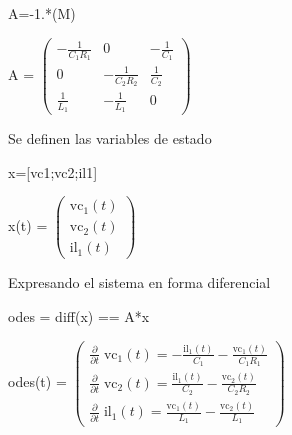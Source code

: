 \documentclass[10pt,a4paper]{article} %
\begin{document}
	\begin{matlabcode}
		A=-1.*(M\N)
	\end{matlabcode}
	\begin{matlabsymbolicoutput}
		A = 
		$\displaystyle \left(\begin{array}{ccc}
		-\frac{1}{C_1  R_1 } & 0 & -\frac{1}{C_1 }\\
		0 & -\frac{1}{C_2  R_2 } & \frac{1}{C_2 }\\
		\frac{1}{L_1 } & -\frac{1}{L_1 } & 0
		\end{array}\right)$
	\end{matlabsymbolicoutput}
	
	\begin{par}
		\begin{flushleft}
			Se definen las variables de estado
		\end{flushleft}
	\end{par}
	
	\begin{matlabcode}
		x=[vc1;vc2;il1]
	\end{matlabcode}
	\begin{matlabsymbolicoutput}
		x(t) = 
		$\displaystyle \left(\begin{array}{c}
		{\textrm{vc}}_1 \left(t\right)\\
		{\textrm{vc}}_2 \left(t\right)\\
		{\textrm{il}}_1 \left(t\right)
		\end{array}\right)$
	\end{matlabsymbolicoutput}
	
	\begin{par}
		\begin{flushleft}
			Expresando el sistema en forma diferencial
		\end{flushleft}
	\end{par}
	
	\begin{matlabcode}
		odes = diff(x) == A*x
	\end{matlabcode}
	\begin{matlabsymbolicoutput}
		odes(t) = 
		$\displaystyle \left(\begin{array}{c}
		\frac{\partial }{\partial t}\;{\textrm{vc}}_1 \left(t\right)=-\frac{{\textrm{il}}_1 \left(t\right)}{C_1 }-\frac{{\textrm{vc}}_1 \left(t\right)}{C_1  R_1 }\\
		\frac{\partial }{\partial t}\;{\textrm{vc}}_2 \left(t\right)=\frac{{\textrm{il}}_1 \left(t\right)}{C_2 }-\frac{{\textrm{vc}}_2 \left(t\right)}{C_2  R_2 }\\
		\frac{\partial }{\partial t}\;{\textrm{il}}_1 \left(t\right)=\frac{{\textrm{vc}}_1 \left(t\right)}{L_1 }-\frac{{\textrm{vc}}_2 \left(t\right)}{L_1 }
		\end{array}\right)$
	\end{matlabsymbolicoutput}
	
\end{document}
